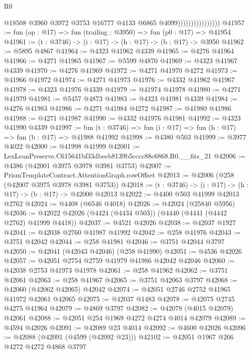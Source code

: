 \begin{lexlean}{R0}
\begin{coremodule}
                                    @18508
                                    @3960
                                    @3972
                                    @3753
                                    @16777
                                    @4133
                                    @6865
                                    @4099))))))))))))))))
@41957 := fun (op : @17) => fun (trailing : @3950) => fun (p0 : @17) => @41954
@41961 := (t : @3746) -> (i : @17) -> (h : @17) -> (b : @17) -> @3950
@41962 := @5895 @4867
@41964 := @4323 @41962 @4339
@41965 := @4276 @41964
@41966 := @4271 @41965
@41967 := @5599 @4870
@41969 := @4323 @41967 @4339
@41970 := @4276 @41969
@41972 := @4271 @41970 @4272
@41973 := @41966 @41972
@41974 := @4271 @41973
@41976 := @4332 @41962 @41967
@41978 := @4323 @41976 @4339
@41979 := @41974 @41978
@41980 := @4271 @41979
@41981 := @5457 @4873
@41983 := @4323 @41981 @4339
@41984 := @4276 @41983
@41986 := @4271 @41984 @4272
@41987 := @41980 @41986
@41988 := @4271 @41987
@41990 := @4332 @41976 @41981
@41992 := @4323 @41990 @4339
@41997 := fun (t : @3746) => fun (i : @17) => fun (h : @17) => fun (b : @17) => @41988 @41992
@41998 := @4380 @503
@41999 := @3977 @4022
@42000 := @41998 @41999
@42001 := LexLeanPreserve.C615641bf33dbeeb8139b5cccc88c6868.R0.__fits_21
@42006 := @4386 (@42001 @3975 @3978 @3981 @3753)
@42007 := PrismTemplateContract.AttentionGraph.rowOffset
@42013 := @42006 (@258 (@42007 @3975 @3978 @3981 @3753))
@42018 := (t : @3746) -> (i : @17) -> (h : @17) -> (b : @17) -> @42000 @42013
@42022 := @4400 @503 @41999 @42013 @2762
@42024 := @4408 (@6546 @4018)
@42026 := @42024 (@25840 @5956)
@42036 := @42022 @42026 (@4424 (@4434 @503)) (@4440 (@4441 (@4442 @2762) @41999 @4418))
@42037 := @4521 @42026
@42038 := @42037 @1927
@42041 := @42038 @2760 @41987 @41992
@42042 := @258 @41976
@42043 := @3751 @42042
@42044 := @258 @41981
@42046 := @3751 @42044 @3797
@42050 := @42041 (@42043 @42046) (@258 @41990)
@42051 := @4536 @42026
@42057 := @42051 @2754 @2759 @41979 @41986 @42042 @42046
@42060 := @42038 @2753 @41973 @41978
@42061 := @258 @41962
@42062 := @3751 @42061
@42063 := @258 @41967
@42065 := @3751 @42063 @3797
@42068 := @42060 (@42062 @42065) @42042
@42074 := @42051 @2746 @2752 @41965 @41972 @42061 @42065
@42075 := @42037 @1483
@42078 := @42075 @2745 @4275 @41964
@42079 := @4869 @3797
@42082 := @42078 (@4015 @42079) @42061
@42088 := @42051 @254 @1969 @4272 @4274 @4014 @42079
@42089 := @4594 @42026
@42091 := @42089 @23 @4014
@42092 := @4600 @42026
@42096 := @42088 (@42091 (@4599 (@42092 @23)))
@42102 := @42051 @1967 @266 @4272 @4272 @4868 @3797

\end{coremodule}
\end{lexlean}
